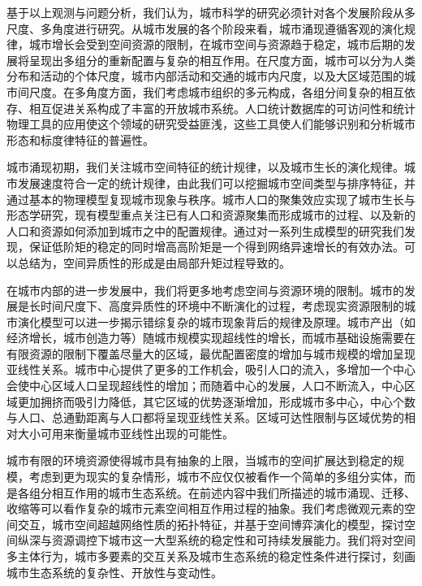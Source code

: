 基于以上观测与问题分析，我们认为，城市科学的研究必须针对各个发展阶段从多尺度、多角度进行研究。从城市发展的各个阶段来看，城市涌现遵循客观的演化规律，城市增长会受到空间资源的限制，在城市空间与资源趋于稳定，城市后期的发展将呈现出多组分的重新配置与复杂的相互作用。在尺度方面，城市可以分为人类分布和活动的个体尺度，城市内部活动和交通的城市内尺度，以及大区域范围的城市间尺度。在多角度方面，我们考虑城市组织的多元构成，各组分间复杂的相互依存、相互促进关系构成了丰富的开放城市系统。人口统计数据库的可访问性和统计物理工具的应用使这个领域的研究受益匪浅，这些工具使人们能够识别和分析城市形态和标度律特征的普遍性。

城市涌现初期，我们关注城市空间特征的统计规律，以及城市生长的演化规律。城市发展速度符合一定的统计规律，由此我们可以挖掘城市空间类型与排序特征，并通过基本的物理模型复现城市现象与秩序\cite{Barthelemy2019}。城市人口的聚集效应实现了城市生长与形态学研究，现有模型重点关注已有人口和资源聚集而形成城市的过程\cite{PhysRevE.58.295,PhysRevLett.112.240601}、以及新的人口和资源如何添加到城市之中的配置规律\cite{ZhangScaling,LiSimple}。通过对一系列生成模型的研究我们发现，保证低阶矩的稳定的同时增高高阶矩是一个得到网络异速增长的有效办法。可以总结为，空间异质性的形成是由局部升矩过程导致的。

在城市内部的进一步发展中，我们将更多地考虑空间与资源环境的限制。城市的发展是长时间尺度下、高度异质性的环境中不断演化的过程，考虑现实资源限制的城市演化模型可以进一步揭示错综复杂的城市现象背后的规律及原理。城市产出（如经济增长，城市创造力等）随城市规模实现超线性的增长\cite{Arbesman2009}，而城市基础设施需要在有限资源的限制下覆盖尽量大的区域，最优配置密度的增加与城市规模的增加呈现亚线性关系\cite{PhysRevE.74.016117}。城市中心提供了更多的工作机会，吸引人口的流入，多增加一个中心会使中心区域人口呈现超线性的增加；而随着中心的发展，人口不断流入，中心区域更加拥挤而吸引力降低，其它区域的优势逐渐增加，形成城市多中心，中心个数与人口、总通勤距离与人口都将呈现亚线性关系\cite{fujita1982multiple,ogawa1989nonmonocentric}。区域可达性限制与区域优势的相对大小可用来衡量城市亚线性出现的可能性。

城市有限的环境资源使得城市具有抽象的上限，当城市的空间扩展达到稳定的规模，考虑到更为现实的复杂情形，城市不应仅仅被看作一个简单的多组分实体，而是各组分相互作用的城市生态系统。在前述内容中我们所描述的城市涌现、迁移、收缩等可以看作复杂的城市元素空间相互作用过程的抽象。我们考虑微观元素的空间交互，城市空间超越网络性质的拓扑特征，并基于空间博弈演化的模型，探讨空间纵深与资源调控下城市这一大型系统的稳定性和可持续发展能力。我们将对空间多主体行为，城市多要素的交互关系及城市生态系统的稳定性条件进行探讨，刻画城市生态系统的复杂性、开放性与变动性。